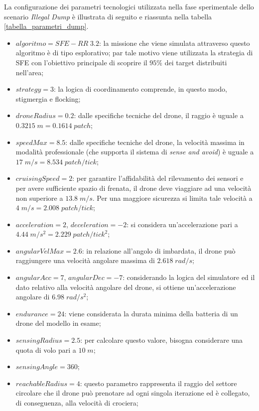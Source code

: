 La configurazione dei parametri tecnologici utilizzata nella fase sperimentale dello scenario \textit{Illegal Dump} è illustrata di seguito e riassunta nella tabella \ref{tabella_parametri_dump}.

\begin{itemize}
    \item $algoritmo = SFE-RR \; 3.2$: la missione che viene simulata attraverso questo algoritmo è di tipo esplorativo; par tale motivo viene utilizzata la strategia di SFE con l'obiettivo principale di scoprire il $95 \%$ dei target distribuiti nell'area;
    \item $strategy = 3$: la logica di coordinamento comprende, in questo modo, stigmergia e flocking;
    \item $droneRadius = 0.2$: dalle specifiche tecniche del drone, il raggio è uguale a $0.3215 \; m = 0.1614 \; patch$;
    \item $speedMax = 8.5$: dalle specifiche tecniche del drone, la velocità massima in modalità professionale (che supporta il sistema di \textit{sense and avoid}) è uguale a $17 \; m/s = 8.534 \; patch/tick$;
    \item $cruisingSpeed = 2$: per garantire l'affidabilità del rilevamento dei sensori e per avere sufficiente spazio di frenata, il drone deve viaggiare ad una velocità non superiore a $13.8 \; m/s$. Per una maggiore sicurezza si limita tale velocità a $4 \; m/s = 2.008 \; patch/tick$;
    \item $acceleration = 2$, $deceleration = -2$: si considera un'accelerazione pari a $4.44 \; m/s^{2} = 2.229 \; patch/tick^{2}$;
    \item $angularVelMax = 2.6$: in relazione all'angolo di imbardata, il drone può raggiungere una velocità angolare massima di $2.618 \; rad/s$;
    \item $angularAcc = 7$, $angularDec = -7$: considerando la logica del simulatore ed il dato relativo alla velocità angolare del drone, si ottiene un'accelerazione angolare di $6.98 \; rad/s^{2}$;
    \item $endurance = 24$: viene considerata la durata minima della batteria di un drone del modello in esame;
    \item $sensingRadius = 2.5$: per calcolare questo valore, bisogna considerare una quota di volo pari a $10 \; m$;
    \item $sensingAngle = 360$;
    \item $reachableRadius = 4$: questo parametro rappresenta il raggio del settore circolare che il drone può prenotare ad ogni singola iterazione ed è collegato, di conseguenza, alla velocità di crociera;

\end{itemize}
